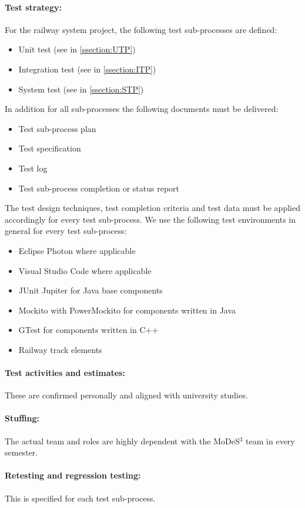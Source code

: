 \paragraph{Test strategy:} 
For the railway system project, the following test sub-processes are defined:
\begin{itemize}
	\item Unit test (see in \autoref{ssection:UTP})
	\item Integration test (see in \autoref{ssection:ITP})
	\item System test (see in \autoref{ssection:STP})
\end{itemize}
In addition for all sub-processes the following documents must be delivered:
\begin{itemize}
	\item Test sub-process plan
	\item Test specification
	\item Test log
	\item Test sub-process completion or status report
\end{itemize}
The test design techniques, test completion criteria and test data must be applied accordingly for every test sub-process. We use the following test environments in general for every test sub-process:
\begin{itemize}
	\item Eclipse Photon where applicable
	\item Visual Studio Code where applicable
	\item JUnit Jupiter for Java base components
	\item Mockito with PowerMockito for components written in Java
	\item GTest for components written in C++
	\item Railway track elements
\end{itemize}
\paragraph{Test activities and estimates:} These are confirmed personally and aligned with university studies.
\paragraph{Stuffing:} The actual team and roles are highly dependent with the MoDeS$^3$ team in every semester.
\paragraph{Retesting and regression testing:} This is specified for each test sub-process.

